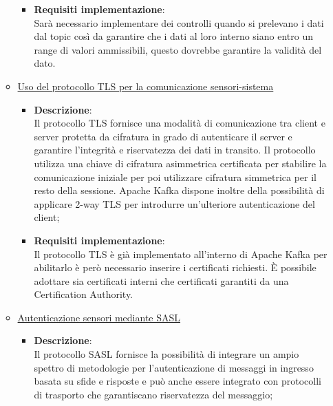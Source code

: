\documentclass[10pt]{article}
\begin{document}
\begin{itemize}
\begin{itemize}
\begin{itemize}
                    \item \textbf{Requisiti implementazione}:\\
                    Sarà necessario implementare dei controlli quando si prelevano i dati dal topic così da garantire che i dati al loro interno siano entro un range di valori ammissibili, questo dovrebbe garantire la validità del dato.

                \end{itemize}

                \item \underline{Uso del protocollo TLS per la comunicazione sensori-sistema}
                \begin{itemize}
                    \item \textbf{Descrizione}:\\
                    Il protocollo TLS fornisce una modalità di comunicazione tra client e server protetta da cifratura in grado di autenticare il server e garantire l'integrità e riservatezza dei dati in transito. Il protocollo utilizza una chiave di cifratura asimmetrica certificata per stabilire la comunicazione iniziale per poi utilizzare cifratura simmetrica per il resto della sessione.
                    Apache Kafka dispone inoltre della possibilità di applicare 2-way TLS per introdurre un'ulteriore autenticazione del client;

                    \item \textbf{Requisiti implementazione}:\\
                    Il protocollo TLS è già implementato all'interno di Apache Kafka per abilitarlo è però necessario inserire i certificati richiesti.
                    È possibile adottare sia certificati interni che certificati garantiti da una Certification Authority.

                \end{itemize}

                \item \underline{Autenticazione sensori mediante SASL}
                \begin{itemize}
                    \item \textbf{Descrizione}:\\
                    Il protocollo SASL fornisce la possibilità di integrare un ampio spettro di metodologie per l'autenticazione di messaggi in ingresso basata su sfide e risposte e può anche essere integrato con protocolli di trasporto che garantiscano riservatezza del messaggio;


\end{itemize}
\end{itemize}
\end{itemize}
\end{document}
